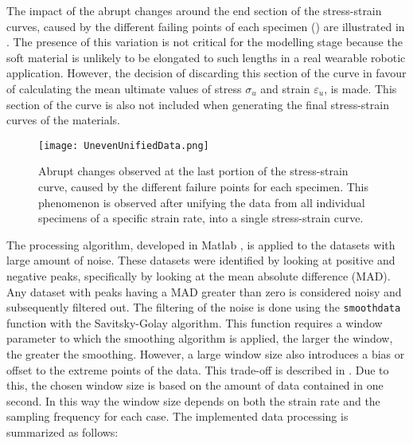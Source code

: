 The impact of the abrupt changes around the end section of the stress-strain curves, caused by the different failing points of each specimen () are illustrated in . The presence of this variation is not critical for the modelling stage because the soft material is unlikely to be elongated to such lengths in a real wearable robotic application. However, the decision of discarding this section of the curve in favour of calculating the mean ultimate values of stress $\sigma_u$ and strain $\varepsilon_u$, is made. This section of the curve is also not included when generating the final stress-strain curves of the materials.

\begin{figure}[htb!]
    \centering
    \texttt{[image: UnevenUnifiedData.png]}
    \caption{Abrupt changes observed at the last portion of the stress-strain curve, caused by the different failure points for each specimen. This phenomenon is observed after unifying the data from all individual specimens of a specific strain rate, into a single stress-strain curve.}
    \label{fig:unevenData}
\end{figure}

The processing algorithm, developed in Matlab \textregistered{}, is applied to the datasets with large amount of noise. These datasets were identified by looking at positive and negative peaks, specifically by looking at the mean absolute difference (MAD). Any dataset with peaks having a MAD greater than zero is considered noisy and subsequently filtered out. The filtering of the noise is done using the \texttt{smoothdata} function with the Savitsky-Golay algorithm. This function requires a window parameter to which the smoothing algorithm is applied, the larger the window, the greater the smoothing. However, a large window size also introduces a bias or offset to the extreme points of the data. This trade-off is described in \cite{sadeghi2018optimum}. Due to this, the chosen window size is based on the amount of data contained in one second. In this way the window size depends on both the strain rate and the sampling frequency for each case. The implemented data processing is summarized as follows:

